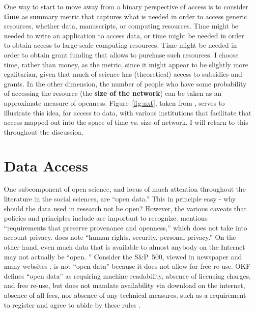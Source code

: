 \documentclass{article}
\begin{document}
One way to start to move away from a binary perspective of access is to consider \textbf{time} as summary metric that captures what is needed in order to access generic resources, whether data, manuscripts, or computing resources. Time might be needed to write an application to access data, or time might be needed in order to obtain access to large-scale computing resources. Time might be needed in order to obtain grant funding that allows to purchase such resources. I choose time, rather than money, as the metric, since it might appear to be slightly more egalitarian, given that much of science has (theoretical) access to subsidies and grants. In the other dimension,  the number of people who have some probability of accessing the resource (the \textbf{size of the network}) can be taken as an approximate measure of openness. Figure~\ref{fig:nxt}, taken from \citet{vilhuber_reproducibility_2023}, serves to illustrate this idea, for access to data, with various institutions that facilitate that access mapped out into the space of time vs. size of network. I will return to this throughout the discussion.



\section{Data Access}
\label{sec:data_access}

One subcomponent of open science, and locus of much attention throughout the literature in the social sciences, are ``open data.'' This in principle easy - why should the data used in research not be open? However, the various caveats that policies and principles include are important to recognize. \parencite{open_knowledge_foundation_defining_2024} mentions ``requirements that preserve provenance and openness,'' which does not take into account privacy. \citet{unesco_understanding_2022} does note  ``human rights, security, personal privacy.'' On the other hand, even much data that is available to almost anybody on the Internet may not actually be ``open. ''  Consider the S\&P~500, viewed in newspaper and many websites \parencite[e.g.][]{sp_dow_jones_indices_llc_sp_2025}, is not ``open data'' because it does not allow for free re-use. OKF defines 
``open data'' as requiring machine readability, absence of licensing charges, and free re-use, but does not mandate availability via download on the internet, absence of all fees, nor absence of any technical measures, such as a requirement to register and agree to abide by these rules \citep{open_knowledge_foundation_defining_2024}. 
\end{document}
